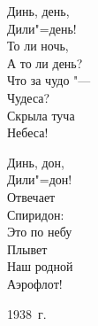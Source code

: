 \vspace{0.75cm}
\noindent\hspace{0.37\textwidth}%
\parbox{0.6\textwidth}{%
Динь, день, \\
Дили"=день! \\
То ли ночь, \\
А то ли день? \\
Что за чудо "--- \\
Чудеса? \\
Скрыла туча \\
Небеса!

\vspace{0.6cm}
\hspace{0.14\textwidth}%
\parbox{0.65\textwidth}{%
Динь, дон, \\
Дили"=дон! \\
Отвечает \\
Спиридон: \\
Это по небу \\
Плывет \\
Наш родной \\
Аэрофлот!
}
}

\vspace{1cm} 
\noindent\hspace{0.69\textwidth} 1938~г.
\vspace{0.5cm}